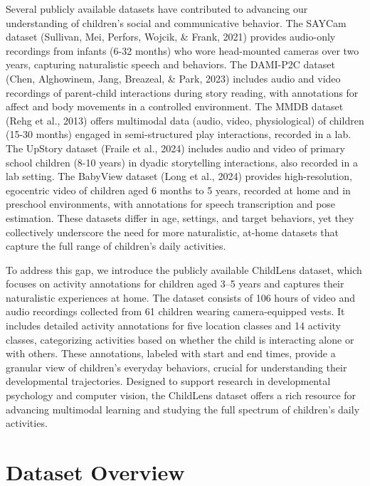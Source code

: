 \documentclass[
  man,floatsintext]{apa6}
\begin{document}
Several publicly available datasets have contributed to advancing our understanding of children's social and communicative behavior. The SAYCam dataset (Sullivan, Mei, Perfors, Wojcik, \& Frank, 2021) provides audio-only recordings from infants (6-32 months) who wore head-mounted cameras over two years, capturing naturalistic speech and behaviors. The DAMI-P2C dataset (Chen, Alghowinem, Jang, Breazeal, \& Park, 2023) includes audio and video recordings of parent-child interactions during story reading, with annotations for affect and body movements in a controlled environment. The MMDB dataset (Rehg et al., 2013) offers multimodal data (audio, video, physiological) of children (15-30 months) engaged in semi-structured play interactions, recorded in a lab. The UpStory dataset (Fraile et al., 2024) includes audio and video of primary school children (8-10 years) in dyadic storytelling interactions, also recorded in a lab setting. The BabyView dataset (Long et al., 2024) provides high-resolution, egocentric video of children aged 6 months to 5 years, recorded at home and in preschool environments, with annotations for speech transcription and pose estimation. These datasets differ in age, settings, and target behaviors, yet they collectively underscore the need for more naturalistic, at-home datasets that capture the full range of children's daily activities.

To address this gap, we introduce the publicly available ChildLens dataset, which focuses on activity annotations for children aged 3--5 years and captures their naturalistic experiences at home. The dataset consists of 106 hours of video and audio recordings collected from 61 children wearing camera-equipped vests. It includes detailed activity annotations for five location classes and 14 activity classes, categorizing activities based on whether the child is interacting alone or with others. These annotations, labeled with start and end times, provide a granular view of children's everyday behaviors, crucial for understanding their developmental trajectories. Designed to support research in developmental psychology and computer vision, the ChildLens dataset offers a rich resource for advancing multimodal learning and studying the full spectrum of children's daily activities.

\section{Dataset Overview}\label{dataset-overview}
\end{document}
